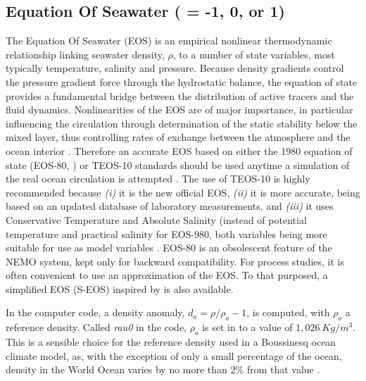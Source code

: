 \subsection{Equation Of Seawater ( = -1, 0, or 1)}
\label{TRA_eos}

The Equation Of Seawater (EOS) is an empirical nonlinear thermodynamic relationship 
linking seawater density, $\rho$, to a number of state variables, 
most typically temperature, salinity and pressure. 
Because density gradients control the pressure gradient force through the hydrostatic balance, 
the equation of state provides a fundamental bridge between the distribution of active tracers 
and the fluid dynamics. Nonlinearities of the EOS are of major importance, in particular 
influencing the circulation through determination of the static stability below the mixed layer, 
thus controlling rates of exchange between the atmosphere  and the ocean interior \citep{Roquet_JPO2015}. 
Therefore an accurate EOS based on either the 1980 equation of state (EOS-80, \cite{UNESCO1983}) 
or TEOS-10 \citep{TEOS10} standards should be used anytime a simulation of the real 
ocean circulation is attempted \citep{Roquet_JPO2015}. 
The use of TEOS-10 is highly recommended because 
\textit{(i)} it is the new official EOS, 
\textit{(ii)} it is more accurate, being based on an updated database of laboratory measurements, and 
\textit{(iii)} it uses Conservative Temperature and Absolute Salinity (instead of potential temperature 
and practical salinity for EOS-980, both variables being more suitable for use as model variables 
\citep{TEOS10, Graham_McDougall_JPO13}. 
EOS-80 is an obsolescent feature of the NEMO system, kept only for backward compatibility.
For process studies, it is often convenient to use an approximation of the EOS. To that purposed, 
a simplified EOS (S-EOS) inspired by \citet{Vallis06} is also available.

In the computer code, a density anomaly, $d_a= \rho / \rho_o - 1$, 
is computed, with $\rho_o$ a reference density. Called \textit{rau0} 
in the code, $\rho_o$ is set in  to a value of $1,026~Kg/m^3$. 
This is a sensible choice for the reference density used in a Boussinesq ocean 
climate model, as, with the exception of only a small percentage of the ocean, 
density in the World Ocean varies by no more than 2$\%$ from that value \citep{Gill1982}.

